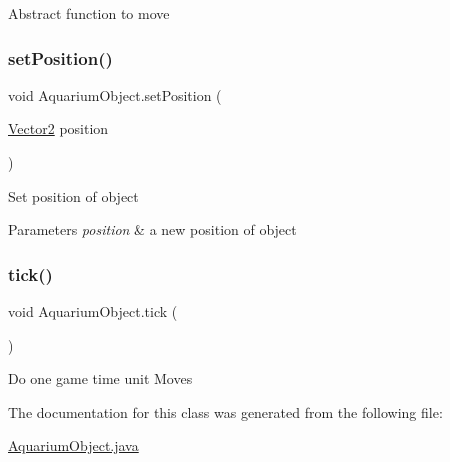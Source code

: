 Abstract function to move \mbox{\label{class_aquarium_object_a5627326c979d8a0edbfea4701ce10bf0}} 
\subsubsection{\texorpdfstring{set\+Position()}{setPosition()}}
{\footnotesize\ttfamily void Aquarium\+Object.\+set\+Position (\begin{DoxyParamCaption}\item[{\mbox{\hyperlink{class_vector2}{Vector2}}}]{position }\end{DoxyParamCaption})\hspace{0.3cm}{\ttfamily [inline]}}

Set position of object 
\begin{DoxyParams}{Parameters}
{\em position} & a new position of object \\
\hline
\end{DoxyParams}
\mbox{\label{class_aquarium_object_a0ca7dc571fc2fb4d34d44e2cb37292e0}} 
\subsubsection{\texorpdfstring{tick()}{tick()}}
{\footnotesize\ttfamily void Aquarium\+Object.\+tick (\begin{DoxyParamCaption}{ }\end{DoxyParamCaption})\hspace{0.3cm}{\ttfamily [inline]}}

Do one game time unit Moves 

The documentation for this class was generated from the following file\+:\begin{DoxyCompactItemize}
\item 
\mbox{\hyperlink{_aquarium_object_8java}{Aquarium\+Object.\+java}}\end{DoxyCompactItemize}
